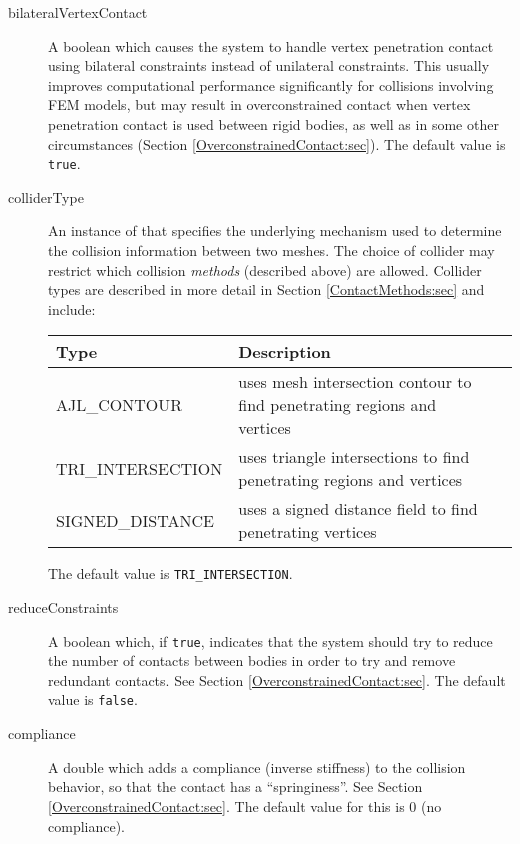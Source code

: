 \begin{description}
\item[bilateralVertexContact]\mbox{}

A boolean which causes the system
to handle vertex penetration contact using bilateral constraints
instead of unilateral constraints.  This usually improves
computational performance significantly for collisions involving FEM
models, but may result in overconstrained contact when vertex penetration 
contact is used between rigid bodies, as well as in
some other circumstances (Section \ref{OverconstrainedContact:sec}).
The default value is {\tt true}.

\item[colliderType]\mbox{}

An instance of
that specifies the underlying mechanism used to determine the
collision information between two meshes. The choice of collider may
restrict which collision {\it methods} (described above) are
allowed. Collider types are described in more detail in 
Section \ref{ContactMethods:sec} and include:

\begin{tabular}{lll}
\hline
Type & Description \\
\hline
AJL\_CONTOUR & uses mesh intersection contour to find penetrating 
regions and vertices\\
TRI\_INTERSECTION & uses triangle intersections to find penetrating 
regions and vertices \\
SIGNED\_DISTANCE & uses a signed distance field to find penetrating vertices\\
\hline
\end{tabular}

The default value is {\tt TRI\_INTERSECTION}.

\item[reduceConstraints]\mbox{}

A boolean which, if {\tt true}, indicates that the system should try
to reduce the number of contacts between bodies in order to try and
remove redundant contacts. See Section
\ref{OverconstrainedContact:sec}.  The default value is {\tt false}.

\item[compliance]\mbox{}

A double which adds a compliance (inverse stiffness) to the collision
behavior, so that the contact has a ``springiness''.  See Section
\ref{OverconstrainedContact:sec}. The default value for this is 0 (no
compliance).


\end{description}
